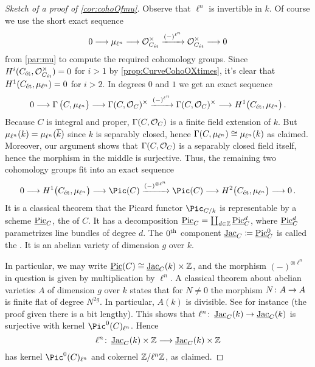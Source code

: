 \begin{proof}[Sketch of a proof of \cref{cor:cohoOfmu}]
	Observe that $\ell^n$ is invertible in $k$. Of course we use the short exact sequence
	\begin{equation*}
		0\morphism \mu_{\ell^n}\morphism \Oo_{C_\et}^\times\xrightarrow{(-)^{\ell^n}}\Oo_{C_\et}^\times\morphism 0
	\end{equation*}
	from \cref{par:mu} to compute the required cohomology groups. Since $H^i(C_{\mathrm{\acute{e}t}},\mathcal{O}_{C_{\mathrm{\acute{e}t}}}^\times)=0$ for $i>1$ by \cref{prop:CurveCohoOXtimes}, it's clear that $H^1(C_{\mathrm{\acute{e}t}},\mu_{\ell^n})=0$ for $i>2$. In degrees $0$ and $1$ we get an exact sequence 
	\begin{equation*}
		0\morphism \Global\big(C,\mu_{\ell^n}\big)\morphism\Global(C,\Oo_C)^\times\xrightarrow{(-)^{\ell^n}} \Global(C,\Oo_C)^\times \morphism H^1\big(C_\et,\mu_{\ell^n}\big)\,.
	\end{equation*}
	Because $C$ is integral and proper, $\operatorname{\Gamma}(C,\mathcal{O}_C)$ is a finite field extension of $k$. But $\mu_{\ell^n}(k)=\mu_{\ell^n}(\ov{k})$ since $k$ is separably closed, hence $\operatorname{\Gamma}(C,\mu_{\ell^n})\cong \mu_{\ell^n}(k)$ as claimed. Moreover, our argument shows that $\operatorname{\Gamma}(C,\mathcal{O}_C)$ is a separably closed field itself, hence the morphism in the middle is surjective. Thus, the remaining two cohomology groups fit into an exact sequence
	\begin{equation*}
		0\morphism H^1\big(C_\et,\mu_{\ell^n}\big)\morphism \Pic(C)\xrightarrow{(-)^{\otimes \ell^n}}\Pic(C)\morphism H^2\big(C_\et,\mu_{\ell^n}\big)\morphism 0\,.
	\end{equation*}
	It is a classical theorem that the Picard functor $\Pic_{C/k}$ is representable by a scheme $\operatorname{\underline{\smash{\mathrm{Pic}}}}_C$, the  of $C$. It has a decomposition $\operatorname{\underline{\smash{\mathrm{Pic}}}}_C=\coprod_{d\in \mathbb{Z}}\operatorname{\underline{\smash{\mathrm{Pic}}}}^d_C$, where $\operatorname{\underline{\smash{\mathrm{Pic}}}}^d_C$ parametrizes line bundles of degree $d$. The $0^{\text{th}}$ component $\operatorname{\underline{\smash{\mathrm{Jac}}}}_C\coloneqq \operatorname{\underline{\smash{\mathrm{Pic}}}}^0_C$ is called the . It is an abelian variety of dimension $g$ over $k$.
	
	In particular, we may write $\operatorname{\underline{\smash{\mathrm{Pic}}}}(C)\cong \operatorname{\underline{\smash{\mathrm{Jac}}}}_C(k)\times \mathbb{Z}$, and the morphism $(-)^{\otimes \ell^n}$ in question is given by multiplication by $\ell^n$. A classical theorem about abelian varieties $A$ of dimension $g$ over $k$ states that for $N\neq 0$ the morphism $N\colon A\morphism A$ is finite flat of degree $N^{2g}$. In particular, $A(k)$ is divisible. See \cite[Theorem~10]{jacobians} for instance (the proof given there is a bit lengthy). This shows that $\ell^n\colon \JAC_C(k)\morphism\JAC_C(k)$ is surjective with kernel $\Pic^0(C)_{\ell^n}$. Hence 
	\begin{equation*}
		\ell^n\colon \JAC_C(k)\times \IZ\morphism\JAC_C(k)\times \IZ
	\end{equation*}
	has kernel $\Pic^0(C)_{\ell^n}$ and cokernel $\mathbb{Z}/\ell^n\mathbb{Z}$, as claimed.
	

\end{proof}
